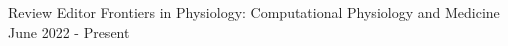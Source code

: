 


\begin{cventries}

  \cventry
    {Review Editor} %
    {Frontiers in Physiology: Computational Physiology and Medicine} %
    {} %
    {June 2022 - Present} %
    {
    }

    
\end{cventries}
